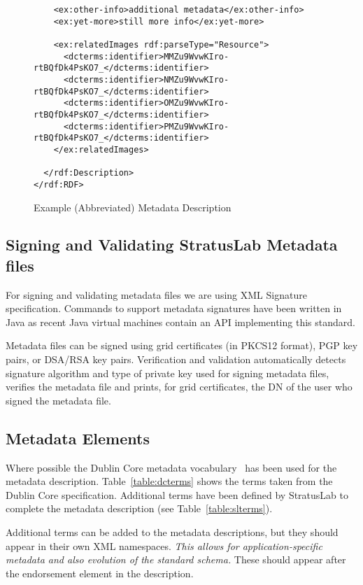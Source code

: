 \begin{figure}
\begin{center}
\begin{verbatim}
    <ex:other-info>additional metadata</ex:other-info>
    <ex:yet-more>still more info</ex:yet-more>
    
    <ex:relatedImages rdf:parseType="Resource">
      <dcterms:identifier>MMZu9WvwKIro-rtBQfDk4PsKO7_</dcterms:identifier>
      <dcterms:identifier>NMZu9WvwKIro-rtBQfDk4PsKO7_</dcterms:identifier>
      <dcterms:identifier>OMZu9WvwKIro-rtBQfDk4PsKO7_</dcterms:identifier>
      <dcterms:identifier>PMZu9WvwKIro-rtBQfDk4PsKO7_</dcterms:identifier>
    </ex:relatedImages>

  </rdf:Description>
</rdf:RDF>
\end{verbatim}
\end{center}
\caption{Example (Abbreviated) Metadata Description}
\label{fig:metadata-example}
\end{figure}

\subsection{Signing and Validating StratusLab Metadata files}

For signing and validating metadata files we are using XML
Signature~\cite{xmlsig} specification.  Commands to support metadata
signatures have been written in Java as recent Java virtual machines
contain an API implementing this standard.

Metadata files can be signed using grid certificates (in PKCS12
format), PGP key pairs, or DSA/RSA key pairs.  Verification and
validation automatically detects signature algorithm and type of
private key used for signing metadata files, verifies the metadata
file and prints, for grid certificates, the DN of the user who signed
the metadata file.

\subsection{Metadata Elements}

Where possible the Dublin Core metadata vocabulary~\cite{dcterms} has
been used for the metadata description.  Table~\ref{table:dcterms}
shows the terms taken from the Dublin Core specification.  Additional
terms have been defined by StratusLab to complete the metadata
description (see Table~\ref{table:slterms}).

Additional terms can be added to the metadata descriptions, but they
should appear in their own XML namespaces.  {\em This allows for
  application-specific metadata and also evolution of the standard
  schema.}  These should appear after the endorsement element in the
description.


